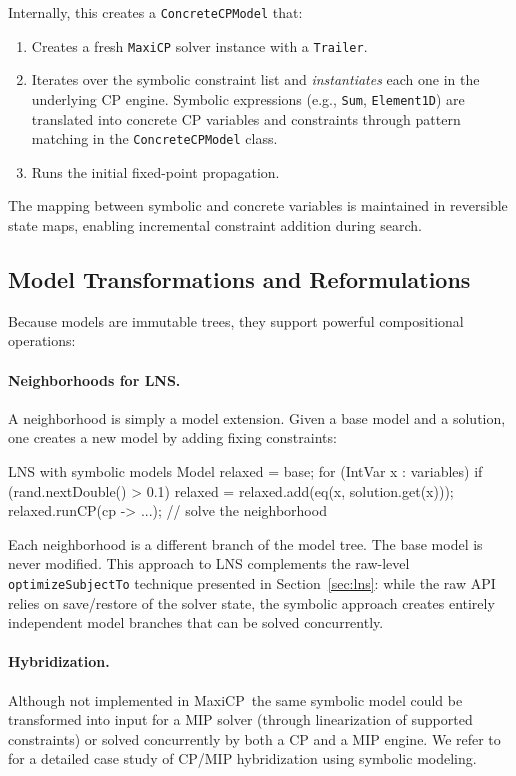 \documentclass[11pt, a4paper]{scrartcl}
\newcommand{\maxicp}{\textsf{MaxiCP}}
\begin{document}
Internally, this creates a \texttt{ConcreteCPModel} that:
\begin{enumerate}
    \item Creates a fresh \texttt{MaxiCP} solver instance with a \texttt{Trailer}.
    \item Iterates over the symbolic constraint list and \emph{instantiates} each one in the underlying CP engine. Symbolic expressions (e.g., \texttt{Sum}, \texttt{Element1D}) are translated into concrete CP variables and constraints through pattern matching in the \texttt{ConcreteCPModel} class.
    \item Runs the initial fixed-point propagation.
\end{enumerate}

The mapping between symbolic and concrete variables is maintained in reversible state maps, enabling incremental constraint addition during search.

\subsection{Model Transformations and Reformulations}

Because models are immutable trees, they support powerful compositional operations:

\paragraph{Neighborhoods for LNS.} A neighborhood is simply a model extension. Given a base model and a solution, one creates a new model by adding fixing constraints:

\begin{codebox}{LNS with symbolic models}
Model relaxed = base;
for (IntVar x : variables) {
    if (rand.nextDouble() > 0.1)
        relaxed = relaxed.add(eq(x, solution.get(x)));
}
relaxed.runCP(cp -> ...); // solve the neighborhood
\end{codebox}

Each neighborhood is a different branch of the model tree. The base model is never modified.
This approach to LNS complements the raw-level \texttt{optimizeSubjectTo} technique presented in Section~\ref{sec:lns}: while the raw API relies on save/restore of the solver state, the symbolic approach creates entirely independent model branches that can be solved concurrently.

\paragraph{Hybridization.} Although not implemented in \maxicp\ the same symbolic model could be transformed into input for a MIP solver (through linearization of supported constraints)
or solved concurrently by both a CP and a MIP engine.
We refer to \cite{van2013objective} for a detailed case study of CP/MIP hybridization using symbolic modeling.
\end{document}
